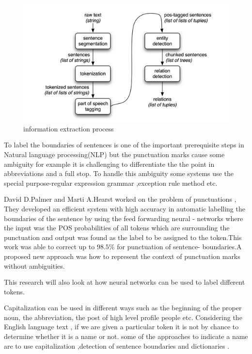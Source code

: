 \begin{itemize}
\begin{figure}[hbtp]
\caption{information extraction process}
\centering
\includegraphics[scale=0.4]{images/nltk.png}
\end{figure}
\end{itemize}

To label the boundaries of sentences is one of the important prerequisite steps in Natural language processing(NLP) but the punctuation marks cause some ambiguity \citep{palmer1994adaptive} for example it is challenging to differentiate the the point in abbreviations and a full stop. 
To handle this ambiguity some systems use the special purpose-regular expression grammar ,exception rule method etc.

David D.Palmer and Marti A.Hearst worked on the problem of punctuations \citep{palmer1994adaptive}, They developed an efficient system with high accuracy in automatic labelling the boundaries of the sentence  by using the feed forwarding neural - networks where the input was the POS probabilities of all tokens which are surrounding the punctuation  and output was found as the label to be assigned to the token.This work was able to correct up to $98.5\%$ for punctuation of  sentence- boundaries.A proposed  new approach was how to  represent the context of punctuation marks without ambiguities. 

This research will also look at how neural networks can be used to label different tokens.



Capitalization can be used in different ways such as the beginning of the proper noun, the abbreviation, the post of high level profile people etc. Considering the English language text , if we are given a  particular token it is not by chance  to  determine whether it is a name or not. some of the approaches to indicate a name are to  use capitalization ,detection of sentence boundaries and dictionaries \citep{baluja2000applying}.


